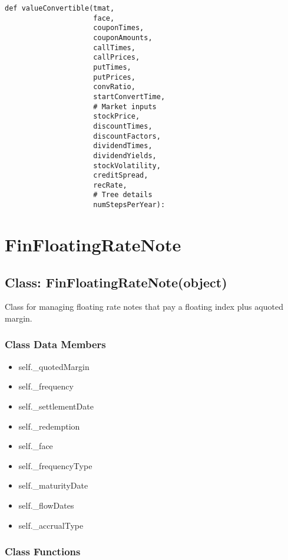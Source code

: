 \documentclass[twoside,11pt]{book}
\begin{document}
\begin{lstlisting}
def valueConvertible(tmat,
                     face,
                     couponTimes,
                     couponAmounts,
                     callTimes,
                     callPrices,
                     putTimes,
                     putPrices,
                     convRatio,
                     startConvertTime,
                     # Market inputs
                     stockPrice,
                     discountTimes,
                     discountFactors,
                     dividendTimes,
                     dividendYields,
                     stockVolatility,
                     creditSpread,
                     recRate,
                     # Tree details
                     numStepsPerYear):
\end{lstlisting}

\newpage
\section{FinFloatingRateNote}

\subsection{Class: FinFloatingRateNote(object)}
Class for managing floating rate notes that pay a floating index plus aquoted margin.

\subsubsection{Class Data Members}
\begin{itemize}
\item{self.\_quotedMargin}
\item{self.\_frequency}
\item{self.\_settlementDate}
\item{self.\_redemption}
\item{self.\_face}
\item{self.\_frequencyType}
\item{self.\_maturityDate}
\item{self.\_flowDates}
\item{self.\_accrualType}
\end{itemize}

\subsubsection{Class Functions}
\end{document}
